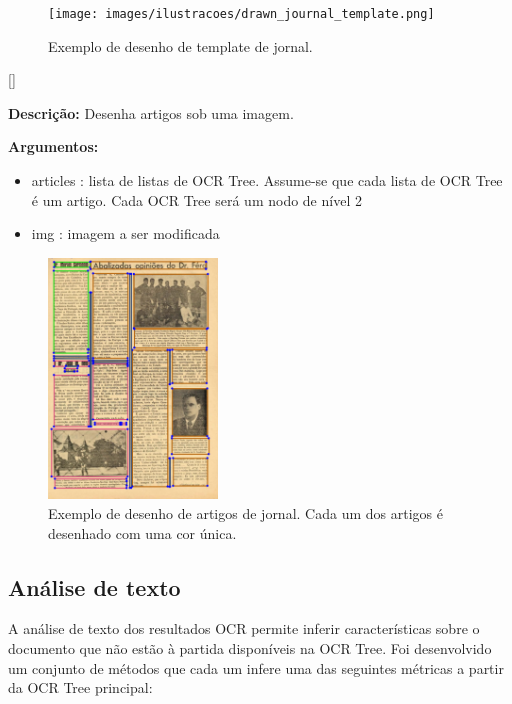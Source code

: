 \begin{figure}[H]
	\centering
	\texttt{[image: images/ilustracoes/drawn\_journal\_template.png]}
	\caption{Exemplo de desenho de template de jornal.}
	\label{fig:draw_journal_template}
\end{figure}



[\normalsize]

\textbf{Descrição:} Desenha artigos sob uma imagem.

\textbf{Argumentos:}
\begin{itemize}\setlength\itemsep{-0.3em}
	\vspace{-0.5em}
	\item articles : lista de listas de OCR Tree. Assume-se que cada lista de OCR Tree é um artigo. Cada OCR Tree será um nodo de nível 2
	\item img : imagem a ser modificada
\end{itemize}

\begin{figure}[H]
	\centering
	\includegraphics[width=0.4\textwidth]{images/ilustracoes/draw_articles.png}
	\caption{Exemplo de desenho de artigos de jornal. Cada um dos artigos é desenhado com uma cor única.}
	\label{fig:draw_articles}
\end{figure}


\subsection{Análise de texto}
\label{contribution_text_analyses}

A análise de texto dos resultados OCR permite inferir características sobre o documento que não estão à partida disponíveis na OCR Tree. Foi desenvolvido um conjunto de métodos que cada um infere uma das seguintes métricas a partir da OCR Tree principal:

